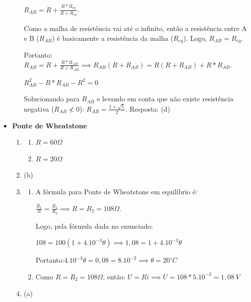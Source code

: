 \documentclass[12pt,letterpaper,fleqn]{article}
\begin{document}
\begin{itemize}
\begin{enumerate}
            $R_{AB}= R + \frac{R*R_{eq}}{R+R_{eq}}$.
            
            Como a malha de resistência vai até o infinito, então a resistência entre A e B ($R_{AB}$) é basicamente a resistência da malha ($R_{eq}$). Logo, $R_{AB}=R_{eq}$.
            
            Portanto: $R_{AB}= R + \frac{R*R_{AB}}{R+R_{AB}} \implies R_{AB}(R+R_{AB})=R(R+R_{AB})+R*R_{AB}$.
            
            $R^2_{AB} - R*R_{AB}-R^2 = 0$
            
            Solucionando para $R_{AB}$ e levando em conta que não existe resistência negativa ($R_{AB}\nless0$): $R_{AB}=\frac{1+\sqrt{5}}{2}$. Resposta: (d)
        \end{enumerate}
        \item \textbf{Ponte de Wheatstone}
        \begin{enumerate}
            \item 
            \begin{enumerate}
                \item $R=60 \Omega$
                \item $R=20 \Omega$
            \end{enumerate}
            \item (b)
            \item \begin{enumerate}
                \item A fórmula para Ponte de Wheatstone em equilíbrio é: 
                
                $\frac{R_1}{R}=\frac{R_1}{R_2} \implies R=R_2=108 \Omega$.
                
                Logo, pela fórmula dada no enunciado:
                
                $108=100(1+4.10^{-3}\theta) \implies 1,08 = 1 +4.10^{-3}\theta$
                
                Portanto:$4.10^{-3}\theta= 0,08=8.10^{-2} \implies \theta = 20 ^{\circ}C$
                
                \item Como $R=R_2=108 \Omega$, então: $U=Ri \implies U=108*5.10^{-3}= 1,08 \: V$
            \end{enumerate}
            \item (a)
        \end{enumerate}
    \end{itemize}
\end{document}
